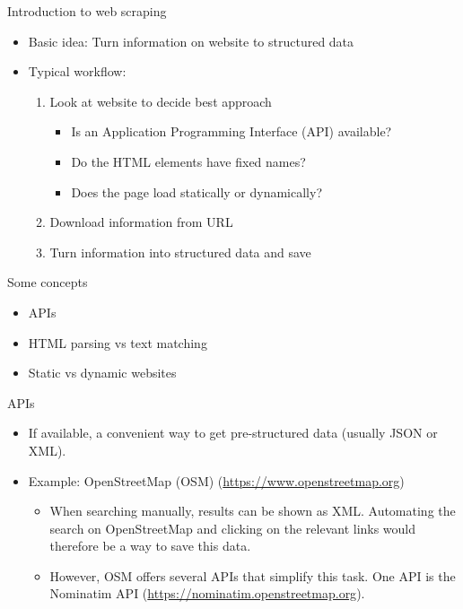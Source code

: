 \begin{frame}{Introduction to web scraping}
\begin{itemize}
	\item Basic idea: Turn information on website to structured data
	\item Typical workflow:
	\begin{enumerate}
		\item Look at website to decide best approach
		\begin{itemize}
			\item Is an Application Programming Interface (API) available?
			\item Do the HTML elements have fixed names?
			\item Does the page load statically or dynamically?
		\end{itemize}
		\item Download information from URL
		\item Turn information into structured data and save
	\end{enumerate}
\end{itemize}
\end{frame}

\begin{frame}{Some concepts}
\begin{itemize}
	\item APIs
	\item HTML parsing vs text matching
	\item Static vs dynamic websites
\end{itemize}
\end{frame}

\begin{frame}{APIs}
\begin{itemize}
	\item If available, a convenient way to get pre-structured data (usually JSON or XML).
	\item Example: OpenStreetMap (OSM) (\url{https://www.openstreetmap.org})
	\begin{itemize}
		\item When searching manually, results can be shown as XML. Automating the search on OpenStreetMap and clicking on the relevant links would therefore be a way to save this data.
		\item However, OSM offers several APIs that simplify this task. One API is the Nominatim API (\url{https://nominatim.openstreetmap.org}).
	\end{itemize}
\end{itemize}
\end{frame}

